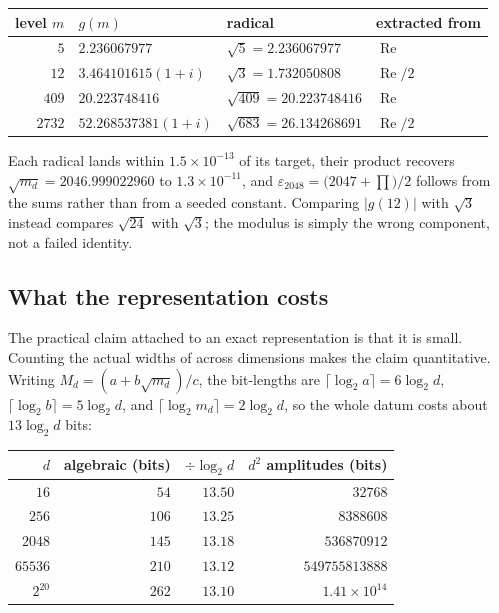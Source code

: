 \documentclass[12pt,a4paper]{article}
\newcommand{\md}{m_d}
\begin{document}
\begin{center}
\begin{tabular}{@{}rlll@{}}
\toprule
level $m$ & $g(m)$ & radical & extracted from \\
\midrule
$5$    & $2.236067977$                & $\sqrt{5} = 2.236067977$    & $\operatorname{Re}$ \\
$12$   & $3.464101615(1+i)$           & $\sqrt{3} = 1.732050808$    & $\operatorname{Re}/2$ \\
$409$  & $20.223748416$               & $\sqrt{409} = 20.223748416$ & $\operatorname{Re}$ \\
$2732$ & $52.268537381(1+i)$          & $\sqrt{683} = 26.134268691$ & $\operatorname{Re}/2$ \\
\bottomrule
\end{tabular}
\end{center}

Each radical lands within $1.5\times10^{-13}$ of its target, their product
recovers $\sqrt{\md} = 2046.999022960$ to $1.3\times10^{-11}$, and
$\varepsilon_{2048} = \bigl(2047 + \prod\bigr)/2$ follows from the sums rather
than from a seeded constant. Comparing $|g(12)|$ with $\sqrt3$ instead compares
$\sqrt{24}$ with $\sqrt3$; the modulus is simply the wrong component, not a
failed identity.

\subsection{What the representation costs}

The practical claim attached to an exact representation is that it is small.
Counting the actual widths of  across dimensions makes
the claim quantitative. Writing $M_d = (a+b\sqrt{\md})/c$, the bit-lengths are
$\lceil\log_2 a\rceil = 6\log_2 d$, $\lceil\log_2 b\rceil = 5\log_2 d$, and
$\lceil\log_2 \md\rceil = 2\log_2 d$, so the whole datum costs about
$13\log_2 d$ bits:

\begin{center}
\begin{tabular}{@{}rrrr@{}}
\toprule
$d$ & algebraic (bits) & $\div \log_2 d$ & $d^2$ amplitudes (bits) \\
\midrule
$16$      & $54$  & $13.50$ & $32768$ \\
$256$     & $106$ & $13.25$ & $8388608$ \\
$2048$    & $145$ & $13.18$ & $536870912$ \\
$65536$   & $210$ & $13.12$ & $549755813888$ \\
$2^{20}$  & $262$ & $13.10$ & $1.41\times10^{14}$ \\
\bottomrule
\end{tabular}
\end{center}
\end{document}
